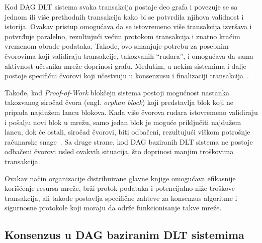 Kod DAG DLT sistema svaka transakcija postaje deo grafa i povezuje se sa jednom ili više prethodnih transakcija kako bi se potvrdila njihova validnost i istorija. Ovakav pristup omogućava da se istovremeno više transakcija izvršava i potvrđuje paralelno, rezultujući većim protokom transakcija i znatno kraćim vremenom obrade podataka. Takođe, ovo smanjuje potrebu za posebnim čvorovima koji validiraju transakcije, takozvanih \enquote{rudara}, i omogućava da sama aktivnost učesnika mreže doprinosi grafu. Međutim, u nekim sistemima i dalje postoje specifični čvorovi koji učestvuju u konsenzusu i finalizaciji transakcija~\cite{university mitosis blockchain vs blockDAG}.



Takođe, kod \textit{Proof-of-Work} blokčejn sistema postoji mogućnost nastanka takozvanog siročad čvora (engl. \textit{orphan block}) koji predstavlja blok koji ne pripada najdužem lancu blokova. Kada više čvorova rudara istovremeno validiraju i pošalju novi blok u mrežu, samo jedan blok je moguće priključiti najdužem lancu, dok će ostali, siročad čvorovi, biti odbačeni, rezultujući viškom potrošnje računarske snage~\cite{investopedia orphan block}. Sa druge strane, kod DAG baziranih DLT sistema ne postoje odbačeni čvorovi usled ovakvih situacija, što doprinosi manjim troškovima transakcija.

Ovakav način organizacije distribuirane glavne knjige omogućava efikasnije korišćenje resursa mreže, brži protok podataka i potencijalno niže troškove transakcija, ali takođe postavlja specifične zahteve za konsenzus algoritme i sigurnosne protokole koji moraju da održe funkcionisanje takve mreže.

\subsection{Konsenzus u DAG baziranim DLT sistemima}


